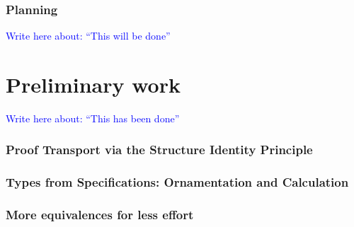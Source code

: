 \documentclass{article}
\theoremstyle{plain}%
\theoremstyle{definition}
\newcommand{\towrite}[1]{\par\textcolor{blue}{Write here about: ``#1''}\par}
\begin{document}
\section{Planning}\label{sec:planning}
\towrite{This will be done}


\part{Preliminary work}\label{part:preliminary}
\towrite{This has been done}

\section{Proof Transport via the Structure Identity Principle}\label{sec:leibniz}


\section{Types from Specifications: Ornamentation and Calculation}\label{sec:numrep}


\section{More equivalences for less effort}\label{sec:userfriendly}


\begin{comment}
\section{FingerTrees}\label{sec:fingertrees}
Fingertrees are often (rightfully so) referred to as ``the fastest persistent datastructure for most purposes'', but while simpler than implementations achieving the same bounds, they are still challenging to reason about; in this section, we will investigate how we can fit the description and analysis of fingertrees, or variants upon them, into the frameworks of calculating datastructures and ornamental programming.

We compare the work in calculating datastructures to solving associativity equations in groups by shifting to the Cayley representation, such as in [..]




\newpage
\section{Temporary}\label{sec:temp}
\listoftodos
%
\end{comment}




\printbibliography
\end{document}
